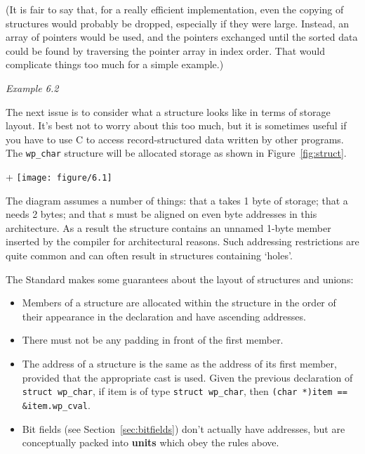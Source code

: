    (It is fair to say that, for a really efficient implementation, even the
    copying of structures would probably be dropped, especially if they were
    large. Instead, an array of pointers would be used, and the pointers
    exchanged until the sorted data could be found by traversing the pointer
    array in index order. That would complicate things too much for a simple
    example.)


   \begin{center}\textit{Example 6.2}\end{center}


   The next issue is to consider what a structure looks like in terms of
    storage layout. It's best not to worry about this too much, but it is
    sometimes useful if you have to use C to access record-structured data
    written by other programs. The \texttt{wp\_char} structure will be
    allocated storage as shown in Figure~\ref{fig:struct}.


    \begin{figure*}[htb]+\centering
      \texttt{[image: figure/6.1]}
      \caption*{Diagram showing the layout of the values in 'struct wp\_char',
        with boxes containing 'wp\_cval',
        an empty space of padding, 'wp\_font' and 'wp\_psize'.}
      \caption{\label{fig:struct}Storage Layout of a Structure}
    \end{figure*}



   The diagram assumes a number of things: that a \kchar{} takes
    1 byte of storage; that a \short{} needs 2 bytes; and that
    \short{}s must be aligned on even byte addresses in this
    architecture. As a result the structure contains an unnamed 1-byte member
    inserted by the compiler for architectural reasons. Such addressing
    restrictions are quite common and can often result in structures containing
    `holes'.


   The Standard makes some guarantees about the layout of structures and
    unions:


   \begin{itemize}
    \item Members of a structure are allocated within the structure in the
     order of their appearance in the declaration and have ascending
     addresses.

    \item There must not be any padding in front of the first member.

    \item The address of a structure is the same as the address of its first
     member, provided that the appropriate cast is used. Given the
     previous declaration of \texttt{struct wp\_char}, if item is of type
     \texttt{struct wp\_char}, then
     \texttt{(char *)item == \&item.wp\_cval}.

    \item Bit fields (see Section~\ref{sec:bitfields}) don't actually have
     addresses, but are conceptually packed into \textbf{units} which obey
     the rules above.
   \end{itemize}

